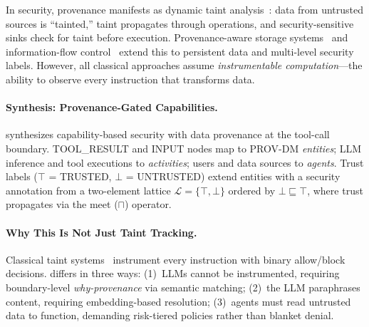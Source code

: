 In security, provenance manifests as dynamic taint analysis~\cite{taint-analysis-survey,taintdroid}: data from untrusted sources is ``tainted,'' taint propagates through operations, and security-sensitive sinks check for taint before execution. Provenance-aware storage systems~\cite{muniswamy2006provenance} and information-flow control~\cite{difc-survey} extend this to persistent data and multi-level security labels. However, all classical approaches assume \emph{instrumentable computation}---the ability to observe every instruction that transforms data.

\paragraph{Synthesis: Provenance-Gated Capabilities.}
\sys{} synthesizes capability-based security with data provenance at the tool-call boundary. TOOL\_RESULT and INPUT nodes map to PROV-DM \emph{entities}; LLM inference and tool executions to \emph{activities}; users and data sources to \emph{agents}. Trust labels ($\top$ = TRUSTED, $\bot$ = UNTRUSTED) extend entities with a security annotation from a two-element lattice $\mathcal{L} = \{\top, \bot\}$ ordered by $\bot \sqsubseteq \top$, where trust propagates via the meet ($\sqcap$) operator.

\paragraph{Why This Is Not Just Taint Tracking.}
Classical taint systems~\cite{taintdroid,difc-survey,flume} instrument every instruction with binary allow/block decisions. \sys{} differs in three ways: (1)~LLMs cannot be instrumented, requiring boundary-level \emph{why-provenance} via semantic matching; (2)~the LLM paraphrases content, requiring embedding-based resolution; (3)~agents must read untrusted data to function, demanding risk-tiered policies rather than blanket denial.
